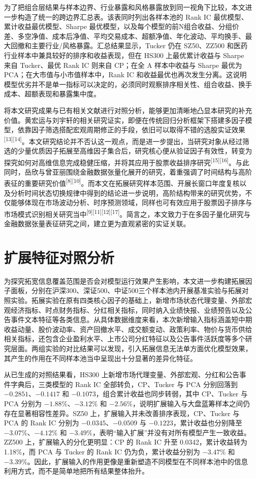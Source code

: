 为了把组合层结果与样本边界、行业暴露和风格暴露放到同一视角下比较，本文进一步构造了统一的跨边界汇总表。该表同时列出各样本池的 Rank IC 最优模型、累计收益最优模型、Sharpe 最优模型，以及每个模型的前N组合收益、分组价差、多空净值、成本后净值、平均交易成本、超额净值、年化波动、平均换手、最大回撤和主要行业/风格暴露。汇总结果显示，Tucker 仍在 SZ50、ZZ500 和医药行业样本中兼具较好的排序和收益表现，但在 HS300 上最优累计收益与 Sharpe 来自 Tucker、最优 Rank IC 则来自 CP；在全 A 样本中收益与 Sharpe 最优为 PCA；在大市值与小市值样本中，Rank IC 和收益最优也再次发生分离。这说明模型优劣并不是单一指标可以决定的，必须同时观察排序相关性、组合收益、换手成本、超额表现和暴露集中度。

将本文研究成果与已有相关文献进行对照分析，能够更加清晰地凸显本研究的补充价值。黄宏运与刘宇轩的相关研究证实，即便在传统回归分析框架下搭建多因子模型，依靠因子筛选搭配宏观周期修正的手段，依旧可以取得不错的选股实证效果\textsuperscript{[13][14]}。本文研究结论并不否认这一观点，而是进一步提出，当研究对象从经过筛选的少量优质因子拓展至高维因子集合后，研究核心便从验证因子有效性，转变为探究如何对高维信息完成稳健压缩，并将其应用于股票收益排序研究\textsuperscript{[15][16]}。与此同时，岳欣与曾亚丽围绕金融数据张量化展开的研究，着重强调了时间结构与高阶表征的重要研究价值\textsuperscript{[8][10]}。而本文在拓展研究样本范围、开展长窗口年度复核以及分析时间状态切换规律中得到的结论进一步说明，高阶结构带来的研究优势，不仅能够体现在市场波动分析、时序预测领域，同样也可有效应用于股票因子排序与市场模式识别相关研究当中\textsuperscript{[9][11][12][17]}。简言之，本文致力于在多因子量化研究与金融数据张量表征研究之间，建立更为直观紧密的实证关联。

\section{扩展特征对照分析}

为探究拓宽信息覆盖范围是否会对模型运行效果产生影响，本文进一步构建拓展因子面板，分别在沪深300、深证500、中证500三个样本池内开展基准实验与拓展对照实验。拓展实验在原有四类核心因子的基础上，新增市场状态代理变量、外部宏观经济指标、时点财务指标、分红相关指标，同时纳入业绩快报、业绩预告以及公告事件文本特征等各类信息。从具体数据维度来看，本次新增输入指标涵盖短中期收益动量、股价波动率、资产回撤水平、成交额变动、政策利率、物价与货币供给相关指标，还包含企业盈利水平、上市公司分红特征以及公告事件活跃度等多个研究层面。两组实验的对比结果可以发现，引入拓展信息无法单方面优化模型效果，其产生的作用在不同样本池当中呈现出十分显著的差异化特征。

从已生成的对照结果看，HS300 上新增市场代理变量、外部宏观、分红和公告事件字典后，三类模型的 Rank IC 全部转负，CP、Tucker 与 PCA 分别回落到 $-0.2851$、$-0.1417$ 和 $-0.1073$，组合累计收益也同步转弱，其中 CP、Tucker 与 PCA 分别为 $-1.88\%$、$-3.12\%$ 和 $-2.56\%$，说明扩展输入与大盘蓝筹样本之间仍存在显著相容性差异。SZ50 上，扩展输入并未改善排序表现，CP、Tucker 与 PCA 的 Rank IC 分别为 $-0.0345$、$-0.0509$ 与 $-0.1223$，累计收益也分别降至 $-3.07\%$、$-4.12\%$ 和 $-3.49\%$，表明“输入扩展”并没有对所有模型产生一致收益。ZZ500 上，扩展输入的分化更明显：CP 的 Rank IC 升至 0.0342，累计收益转为 1.18\%，而 PCA 与 Tucker 的 Rank IC 仍为负，累计收益分别为 $-3.47\%$ 和 $-3.39\%$。因此，扩展输入的作用更像是重新塑造不同模型在不同样本池中的信息利用方式，而不是简单地把所有结果整体抬升。

